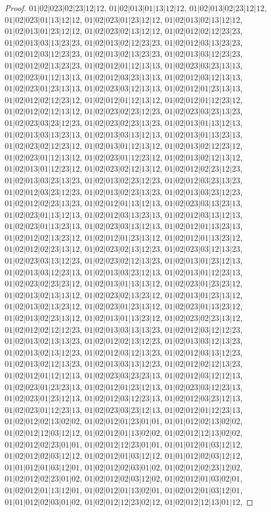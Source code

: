 \documentclass[12pt]{article}
\theoremstyle{plain}
\theoremstyle{definition}
\theoremstyle{remark}
\begin{document}
\begin{proof}
$01|02|023|02|23|12|12$, $01|02|013|01|13|12|12$, $01|02|013|02|23|12|12$, $01|02|023|01|13|12|12$, $01|02|023|01|23|12|12$, $01|02|013|02|13|12|12$, $01|02|013|01|23|12|12$, $01|02|023|02|13|12|12$, $01|02|012|02|12|23|23$, $01|02|013|03|13|23|23$, $01|02|013|02|12|23|23$, $01|02|012|03|13|23|23$, $01|02|012|03|12|23|23$, $01|02|013|02|13|23|23$, $01|02|013|03|12|23|23$, $01|02|012|02|13|23|23$, $01|02|012|01|12|13|13$, $01|02|023|03|23|13|13$, $01|02|023|01|12|13|13$, $01|02|012|03|23|13|13$, $01|02|012|03|12|13|13$, $01|02|023|01|23|13|13$, $01|02|023|03|12|13|13$, $01|02|012|01|23|13|13$, $01|02|012|02|12|23|12$, $01|02|012|01|12|13|12$, $01|02|012|01|12|23|12$, $01|02|012|02|12|13|12$, $01|02|023|02|23|12|23$, $01|02|023|03|23|13|23$, $01|02|023|03|23|12|23$, $01|02|023|02|23|13|23$, $01|02|013|01|13|12|13$, $01|02|013|03|13|23|13$, $01|02|013|03|13|12|13$, $01|02|013|01|13|23|13$, $01|02|023|02|12|23|12$, $01|02|013|01|12|13|12$, $01|02|013|02|12|23|12$, $01|02|023|01|12|13|12$, $01|02|023|01|12|23|12$, $01|02|013|02|12|13|12$, $01|02|013|01|12|23|12$, $01|02|023|02|12|13|12$, $01|02|012|02|23|12|23$, $01|02|013|03|23|13|23$, $01|02|013|02|23|12|23$, $01|02|012|03|23|13|23$, $01|02|012|03|23|12|23$, $01|02|013|02|23|13|23$, $01|02|013|03|23|12|23$, $01|02|012|02|23|13|23$, $01|02|012|01|13|12|13$, $01|02|023|03|13|23|13$, $01|02|023|01|13|12|13$, $01|02|012|03|13|23|13$, $01|02|012|03|13|12|13$, $01|02|023|01|13|23|13$, $01|02|023|03|13|12|13$, $01|02|012|01|13|23|13$, $01|02|012|02|13|23|12$, $01|02|012|01|23|13|12$, $01|02|012|01|13|23|12$, $01|02|012|02|23|13|12$, $01|02|023|02|13|12|23$, $01|02|023|03|12|13|23$, $01|02|023|03|13|12|23$, $01|02|023|02|12|13|23$, $01|02|013|01|23|12|13$, $01|02|013|03|12|23|13$, $01|02|013|03|23|12|13$, $01|02|013|01|12|23|13$, $01|02|023|02|23|23|12$, $01|02|013|01|13|13|12$, $01|02|023|01|23|23|12$, $01|02|013|02|13|13|12$, $01|02|023|02|13|23|12$, $01|02|013|01|23|13|12$, $01|02|013|02|13|23|12$, $01|02|023|01|23|13|12$, $01|02|023|01|13|23|12$, $01|02|013|02|23|13|12$, $01|02|013|01|13|23|12$, $01|02|023|02|23|13|12$, $01|02|012|02|12|12|23$, $01|02|013|03|13|13|23$, $01|02|012|03|12|12|23$, $01|02|013|02|13|13|23$, $01|02|012|02|13|12|23$, $01|02|013|03|12|13|23$, $01|02|013|02|13|12|23$, $01|02|012|03|12|13|23$, $01|02|012|03|13|12|23$, $01|02|013|02|12|13|23$, $01|02|013|03|13|12|23$, $01|02|012|02|12|13|23$, $01|02|012|01|12|12|13$, $01|02|023|03|23|23|13$, $01|02|012|03|12|12|13$, $01|02|023|01|23|23|13$, $01|02|012|01|23|12|13$, $01|02|023|03|12|23|13$, $01|02|023|01|23|12|13$, $01|02|012|03|12|23|13$, $01|02|012|03|23|12|13$, $01|02|023|01|12|23|13$, $01|02|023|03|23|12|13$, $01|02|012|01|12|23|13$, $01|02|012|02|13|02|02$, $01|02|012|01|23|01|01$, $01|01|012|02|13|02|02$, $01|02|012|12|03|12|12$, $01|02|012|01|13|02|02$, $01|02|012|12|13|02|02$, $01|02|012|02|23|01|01$, $01|02|012|12|23|01|01$, $01|01|012|01|03|12|12$, $01|02|012|02|03|12|12$, $01|02|012|01|03|12|12$, $01|01|012|02|03|12|12$, $01|01|012|01|03|12|01$, $01|02|012|02|03|01|02$, $01|02|012|02|23|12|02$, $01|02|012|02|23|01|02$, $01|02|012|02|03|12|02$, $01|02|012|01|03|02|01$, $01|02|012|01|13|12|01$, $01|02|012|01|13|02|01$, $01|02|012|01|03|12|01$, $01|01|012|02|03|01|02$, $01|02|012|12|23|02|12$, $01|02|012|12|13|01|12$, 
\end{proof}
\end{document}
